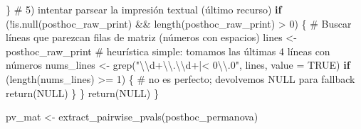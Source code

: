 \documentclass[
  spanish,
  11pt,
  a4paper,
  DIV=11,
  numbers=noendperiod]{scrartcl}
\newenvironment{Shaded}{\begin{snugshade}}{\end{snugshade}}
\newcommand{\AttributeTok}[1]{\textcolor[rgb]{0.40,0.45,0.13}{#1}}
\newcommand{\CommentTok}[1]{\textcolor[rgb]{0.37,0.37,0.37}{#1}}
\newcommand{\ConstantTok}[1]{\textcolor[rgb]{0.56,0.35,0.01}{#1}}
\newcommand{\ControlFlowTok}[1]{\textcolor[rgb]{0.00,0.23,0.31}{\textbf{#1}}}
\newcommand{\DecValTok}[1]{\textcolor[rgb]{0.68,0.00,0.00}{#1}}
\newcommand{\FunctionTok}[1]{\textcolor[rgb]{0.28,0.35,0.67}{#1}}
\newcommand{\NormalTok}[1]{\textcolor[rgb]{0.00,0.23,0.31}{#1}}
\newcommand{\OtherTok}[1]{\textcolor[rgb]{0.00,0.23,0.31}{#1}}
\newcommand{\SpecialCharTok}[1]{\textcolor[rgb]{0.37,0.37,0.37}{#1}}
\newcommand{\StringTok}[1]{\textcolor[rgb]{0.13,0.47,0.30}{#1}}
\begin{document}
\begin{Shaded}
\begin{Highlighting}[numbers=left,,]
\NormalTok{  \}}
  \CommentTok{\# 5) intentar parsear la impresión textual (último recurso)}
  \ControlFlowTok{if}\NormalTok{ (}\SpecialCharTok{!}\FunctionTok{is.null}\NormalTok{(posthoc\_raw\_print) }\SpecialCharTok{\&\&} \FunctionTok{length}\NormalTok{(posthoc\_raw\_print) }\SpecialCharTok{\textgreater{}} \DecValTok{0}\NormalTok{) \{}
    \CommentTok{\# Buscar líneas que parezcan filas de matriz (números con espacios)}
\NormalTok{    lines }\OtherTok{\textless{}{-}}\NormalTok{ posthoc\_raw\_print}
    \CommentTok{\# heurística simple: tomamos las últimas 4 líneas con números}
\NormalTok{    nums\_lines }\OtherTok{\textless{}{-}} \FunctionTok{grep}\NormalTok{(}\StringTok{"}\SpecialCharTok{\textbackslash{}\textbackslash{}}\StringTok{d+}\SpecialCharTok{\textbackslash{}\textbackslash{}}\StringTok{.}\SpecialCharTok{\textbackslash{}\textbackslash{}}\StringTok{d+|\textless{} 0}\SpecialCharTok{\textbackslash{}\textbackslash{}}\StringTok{.0"}\NormalTok{, lines, }\AttributeTok{value =} \ConstantTok{TRUE}\NormalTok{)}
    \ControlFlowTok{if}\NormalTok{ (}\FunctionTok{length}\NormalTok{(nums\_lines) }\SpecialCharTok{\textgreater{}=} \DecValTok{1}\NormalTok{) \{}
      \CommentTok{\# no es perfecto; devolvemos NULL para fallback}
      \FunctionTok{return}\NormalTok{(}\ConstantTok{NULL}\NormalTok{)}
\NormalTok{    \}}
\NormalTok{  \}}
  \FunctionTok{return}\NormalTok{(}\ConstantTok{NULL}\NormalTok{)}
\NormalTok{\}}

\NormalTok{pv\_mat }\OtherTok{\textless{}{-}} \FunctionTok{extract\_pairwise\_pvals}\NormalTok{(posthoc\_permanova)}


\end{Highlighting}
\end{Shaded}
\end{document}
